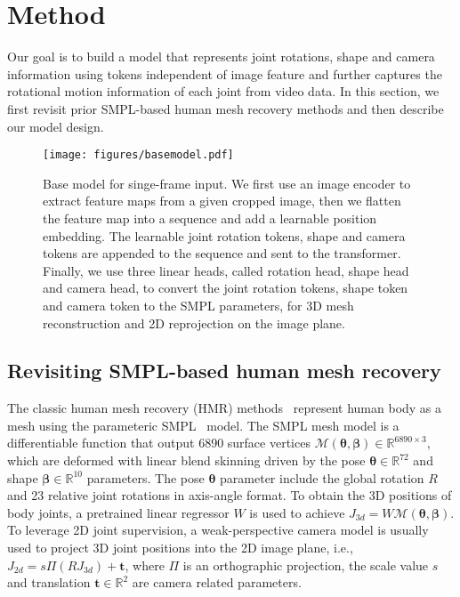 \section{Method}


Our goal is to build a model that represents joint rotations, shape and camera information using tokens independent of image feature and further captures the rotational motion information of each joint from video data.
In this section, we first revisit prior SMPL-based human mesh recovery methods and then describe our model design.

\begin{figure}[t]
	\centering
	\texttt{[image: figures/basemodel.pdf]}
	\caption{Base model for singe-frame input. We first use an image encoder to extract feature maps from a given cropped image, then we flatten the feature map into a sequence and add a learnable position embedding. The learnable joint rotation tokens, shape and camera tokens are appended to the sequence and sent to the transformer. Finally, we use three linear heads, called rotation head, shape head and camera head, to convert the joint rotation tokens, shape token and camera token to the SMPL parameters, for 3D mesh reconstruction and 2D reprojection on the image plane.}
	\label{fig:base_model}\vspace{-0.1in}
\end{figure}




\subsection{Revisiting SMPL-based human mesh recovery}

The classic human mesh recovery (HMR) methods~\citep{hmr:kanazawa2018end, hmmr:kanazawa2019learning, vibe:kocabas2020vibe} represent human body as a mesh using the parameteric SMPL~\citep{smpl:loper2015smpl} model. The SMPL mesh model is a differentiable function that output 6890 surface vertices $\mathcal{M}(\boldsymbol{\theta}, \boldsymbol{\beta}) \in \mathbb{R}^{6890 \times 3}$, which are deformed with linear blend skinning driven by the pose $\boldsymbol{\theta} \in \mathbb{R}^{72}$ and shape $\boldsymbol{\beta} \in \mathbb{R}^{10}$ parameters. The pose $\boldsymbol{\theta}$ parameter include the global rotation $R$ and 23 relative joint rotations in axis-angle format. To obtain the 3D positions of body joints, a pretrained linear regressor $W$ is used to achieve $J_{3d}=W\mathcal{M}(\boldsymbol{\theta}, \boldsymbol{\beta})$. To leverage 2D joint supervision, a weak-perspective camera model is usually used to project 3D joint positions into the 2D image plane, i.e., $J_{2d}=s\Pi(RJ_{3d})+\boldsymbol{t} $, where $\Pi$ is an orthographic projection, the scale value $s$ and translation $\boldsymbol{t}\in \mathbb{R}^{2}$ are camera related parameters.

